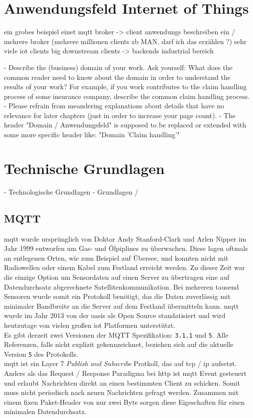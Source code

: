 \section{Anwendungsfeld Internet of Things}

ein grobes beispiel einet mqtt broker -> client anwendungs beschreiben
ein / mehrere broker (mehrere millionen clients zb MAN, darf ich das erzählen ?)
sehr viele iot clients
big downstream clients -> backends
industrial bereich

- Describe the (business) domain of your work. Ask yourself: What does the common reader need to know about the domain in order to understand the results of your work? For example, if you work contributes to the claim handling process of some insurance company, describe the common claim handling process.
- Please refrain from meandering explanations about details that have no relevance for later chapters (just in order to increase your page count).
- The header "Domain / Anwendungsfeld" is supposed to be replaced or extended with some more specific header like: "Domain 'Claim handling'"

\section{Technische Grundlagen} - Technologische Grundlagen - Grundlagen /

\subsection{MQTT}
\acf{mqtt} wurde ursprünglich von Doktor Andy Stanford-Clark und Arlen Nipper im Jahr 1999 entworfen um Gas- und Ölpiplines zu überwachen. Diese lagen oftmals an entlegenen Orten, wie zum Beispiel auf Übersee, und konnten nicht mit Radiowellen oder einem Kabel zum Festland erreicht werden. Zu dieser Zeit war die einzige Option um Sensordaten auf einen Server zu übertragen eine auf Datendurchsatz abgerechnete Satellitenkommunikation. Bei mehreren tausend Sensoren wurde somit ein Protokoll benötigt, das die Daten zuverlässig mit minimaler Bandbreite an die Server auf dem Festland übermitteln kann.
\ac{mqtt} wurde im Jahr 2013 von der \ac{oasis} als Open Source standatisiert und wird heutzutage von vielen gro{\ss}en \ac{iot} Platformen unterstützt.\cite{WhatMQTTDefinition}\\
Es gibt derzeit zwei Versionen der MQTT Spezifikation: \verb|3.1.1| und \verb|5|. Alle Referenzen, falls nicht explizit gekennzeichnet, beziehen sich auf die aktuelle Version \verb|5| des Protokolls.\\
\ac{mqtt} ist ein Layer 7 \textit{Publish and Subscribe} Protkoll, das auf \acs{tcp} / \acs{ip} aufsetzt. Anders als das Request / Response Paradigma bei \acs{http} ist \ac{mqtt} Event gesteuert und erlaubt Nachrichten direkt an einen bestimmten Client zu schicken. Somit muss nicht periodisch nach neuen Nachrichten gefragt werden. Zusammen mit einem fixen Paket-Header von nur zwei Byte sorgen diese Eigeschaften für einen minimalen Datendurchsatz.\cite{WhatMQTTDefinition}\\

